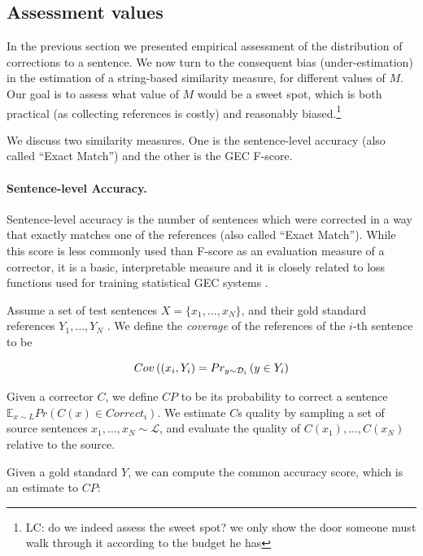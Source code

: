 \documentclass[letter,11pt]{article}
\newcommand{\lc}[1]{\footnote{\color{green}LC: #1}}
\begin{document}
\subsection{Assessment values} \label{subsec:Assessment-values}

In the previous section we presented empirical assessment of the distribution of
corrections to a sentence. We now turn to the consequent bias (under-estimation) in the estimation of a string-based similarity measure, for different values of $M$. Our goal is to assess what value of $M$ would be a sweet spot, which is both practical (as collecting references is costly) and reasonably biased.\lc{do we indeed assess the sweet spot? we only show the door someone must walk through it according to the budget he has}

We discuss two similarity measures. One is the sentence-level accuracy (also called ``Exact Match'') and the other is the GEC F-score.
 
\paragraph{Sentence-level Accuracy.}
Sentence-level accuracy is the number of sentences which were corrected in a way that exactly matches one of the
references (also called ``Exact Match''). While this score is less commonly used than F-score as an evaluation
measure of a corrector, it is a basic, interpretable measure and it is closely related to loss functions used for
training statistical GEC systems \cite{rozovskaya2010training,chodorow2012problems,rozovskaya2013joint}. 

Assume a set of test sentences $X=\{x_1,\ldots,x_N\}$,
and their gold standard references $Y_1,\ldots,Y_N$ . We define the
{\it coverage} of the references of the $i$-th sentence to be

\begin{equation}
  \footnotesize
  Cov\left((x_i,Y_i\right)=Pr_{y \sim \mathcal{D}_i}\left(y \in Y_i\right)
\end{equation}

Given a corrector $C$, we define $CP$ to be its probability to correct a sentence $\mathbb{E}_{x\sim{L}}Pr\left(C\left(x\right)\in Correct_i\right)$. We estimate $C$s quality by sampling a set of source sentences
$x_1,\ldots,x_N \sim \mathcal{L}$, and evaluate the quality of $C(x_1),\ldots,C(x_N)$ relative
to the source. 

Given a gold standard $Y$, we can compute the common accuracy score, which is an estimate to $CP$:
\end{document}
